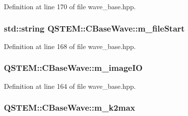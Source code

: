 Definition at line 170 of file wave\-\_\-base.\-hpp.

\hypertarget{class_q_s_t_e_m_1_1_c_base_wave_ac5cc9c0ec149ffa044f94effb4deda85}{
\subsubsection[{m\-\_\-file\-Start}]{\setlength{\rightskip}{0pt plus 5cm}std\-::string Q\-S\-T\-E\-M\-::\-C\-Base\-Wave\-::m\-\_\-file\-Start\hspace{0.3cm}{\ttfamily [protected]}}}\label{class_q_s_t_e_m_1_1_c_base_wave_ac5cc9c0ec149ffa044f94effb4deda85}


Definition at line 168 of file wave\-\_\-base.\-hpp.

\hypertarget{class_q_s_t_e_m_1_1_c_base_wave_ac94d4576239a0b5f7cc82752b9b0b27e}{
\subsubsection[{m\-\_\-image\-I\-O}]{ Q\-S\-T\-E\-M\-::\-C\-Base\-Wave\-::m\-\_\-image\-I\-O\hspace{0.3cm}{\ttfamily [protected]}}}\label{class_q_s_t_e_m_1_1_c_base_wave_ac94d4576239a0b5f7cc82752b9b0b27e}


Definition at line 164 of file wave\-\_\-base.\-hpp.

\hypertarget{class_q_s_t_e_m_1_1_c_base_wave_af84acf58c64ff7f5b43328460a022cf6}{
\subsubsection[{m\-\_\-k2max}]{ Q\-S\-T\-E\-M\-::\-C\-Base\-Wave\-::m\-\_\-k2max\hspace{0.3cm}{\ttfamily [protected]}}}\label{class_q_s_t_e_m_1_1_c_base_wave_af84acf58c64ff7f5b43328460a022cf6}


